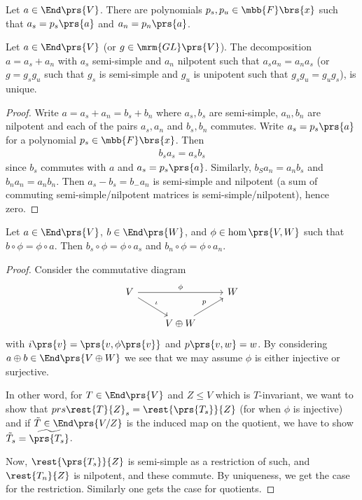 \documentclass[10pt,a4paper,twoside,openany,hidelinks]{book}
\begin{document}

\begin{proposition}
Let $a \in \End\prs{V}$. There are polynomials $p_s, p_u  \in \mbb{F}\brs{x}$ such that $a_s = p_s\prs{a}$ and $a_n = p_n\prs{a}$.
\end{proposition}

\begin{corollary}
Let $a \in \End\prs{V}$ (or $g \in \mrm{GL}\prs{V}$). The decomposition $a = a_s + a_n$ with $a_s$ semi-simple and $a_n$ nilpotent such that $a_s a_n = a_n a_s$ (or $g = g_s g_u$ such that $g_s$ is semi-simple and $g_u$ is unipotent such that $g_s g_u = g_u g_s$), is unique.
\end{corollary}

\begin{proof}
Write $a = a_s + a_n = b_s + b_n$ where $a_s, b_s$ are semi-simple, $a_n,b_n$ are nilpotent and each of the pairs $a_s, a_n$ and $b_s, b_n$ commutes. Write $a_s = p_s\prs{a}$ for a polynomial $p_s \in \mbb{F}\brs{x}$.
Then
\begin{align*}
b_s a_s = a_s b_s
\end{align*}
since $b_s$ commutes with $a$ and $a_s = p_s\prs{a}$.
Similarly, $b_S a_n = a_n b_s$ and $b_n a_n = a_n b_n$.
Then
$a_s - b_s = b_ - a_n$ is semi-simple and nilpotent (a sum of commuting semi-simple/nilpotent matrices is semi-simple/nilpotent), hence zero.
\end{proof}

\begin{lemma}
Let $a \in \End\prs{V}$, $b \in \End\prs{W}$, and $\phi \in \hom\prs{V,W}$ such that $b \circ \phi = \phi \circ a$. Then $b_s \circ \phi = \phi \circ a_s$ and $b_n \circ \phi = \phi \circ a_n$.
\end{lemma}

\begin{proof}
Consider the commutative diagram
\[
\begin{tikzcd}
V \arrow[rr, "\phi"] \arrow[dr, "\iota"] & & W \\
& V \oplus W \arrow[ur, "p"]
\end{tikzcd}
\]
with $i\prs{v} = \prs{v, \phi\prs{v}}$ and $p\prs{v,w} = w$.
By considering $a \oplus b \in \End\prs{V \oplus W}$ we see that we may assume $\phi$ is either injective or surjective.

In other word, for $T \in \End\prs{V}$ and $Z \leq V$ which is $T$-invariant, we want to show that $prs{\rest{T}{Z}}_s = \rest{\prs{T_s}}{Z}$ (for when $\phi$ is injective) and if $\tilde{T} \in \End\prs{V/Z}$ is the induced map on the quotient, we have to show $\tilde{T}_s = \widetilde{\prs{T_s}}$.

Now, $\rest{\prs{T_s}}{Z}$ is semi-simple as a restriction of such, and $\rest{T_n}{Z}$ is nilpotent, and these commute. By uniqueness, we get the case for the restriction. Similarly one gets the case for quotients.
\end{proof}
\end{document}
